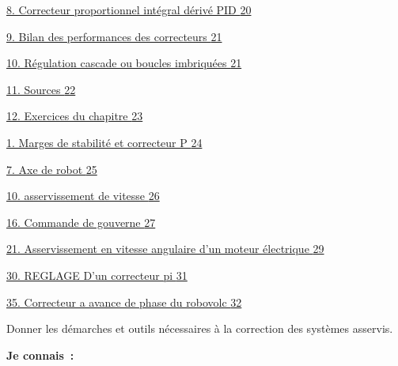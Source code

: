 \protect\hyperlink{_Toc120222127}{8. Correcteur proportionnel intégral dérivé PID \protect\hyperlink{_Toc120222127}{20}}

\protect\hyperlink{bilan-des-performances-des-correcteurs}{9. Bilan des performances des correcteurs \protect\hyperlink{bilan-des-performances-des-correcteurs}{21}}

\protect\hyperlink{ruxe9gulation-cascade-ou-boucles-imbriquuxe9es}{10. Régulation cascade ou boucles imbriquées \protect\hyperlink{ruxe9gulation-cascade-ou-boucles-imbriquuxe9es}{21}}

\protect\hyperlink{sources}{11. Sources \protect\hyperlink{sources}{22}}

\protect\hyperlink{_Toc120222131}{12. Exercices du chapitre \protect\hyperlink{_Toc120222131}{23}}

\protect\hyperlink{_Toc120222132}{1. Marges de stabilité et correcteur P \protect\hyperlink{_Toc120222132}{24}}

\protect\hyperlink{_Toc120222133}{7. Axe de robot \protect\hyperlink{_Toc120222133}{25}}

\protect\hyperlink{_Toc120222134}{10. asservissement de vitesse \protect\hyperlink{_Toc120222134}{26}}

\protect\hyperlink{_Toc120222135}{16. Commande de gouverne \protect\hyperlink{_Toc120222135}{27}}

\protect\hyperlink{_Toc120222136}{21. Asservissement en vitesse angulaire d'un moteur électrique \protect\hyperlink{_Toc120222136}{29}}

\protect\hyperlink{reglage-dun-correcteur-pi}{30. REGLAGE D'un correcteur pi \protect\hyperlink{reglage-dun-correcteur-pi}{31}}

\protect\hyperlink{_Toc120222138}{35. Correcteur a avance de phase du robovolc \protect\hyperlink{_Toc120222138}{32}}

Donner les démarches et outils nécessaires à la correction des systèmes asservis.

\textbf{Je connais~:}

